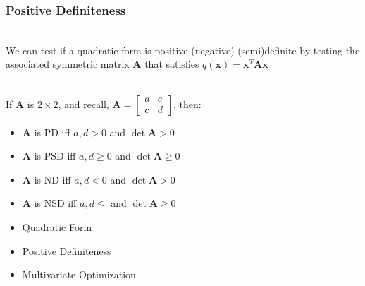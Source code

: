 \documentclass{beamer}
\numberwithin{equation}{section}
\begin{document}
\begin{frame}
\frametitle{Positive Definiteness}

\ \\We can test if a quadratic form is positive (negative) (semi)definite by testing the associated symmetric matrix $\mathbf{A}$ that satisfies $q(\mathbf{x})=\mathbf{x}^T\mathbf{A}\mathbf{x}$ \pause

\ \\If $\mathbf{A}$ is $2\times 2$, and recall, $\mathbf{A}=\begin{bmatrix}a& c\\c& d\end{bmatrix}$, then: \pause

\begin{itemize}
\item $\mathbf{A}$ is PD iff $a, d>0$ and $\det \mathbf{A}>0$ \pause
\item $\mathbf{A}$ is PSD iff  $a, d\geq0$ and $\det \mathbf{A}\geq 0$ \pause
\item $\mathbf{A}$ is ND iff $a, d<0$ and $\det \mathbf{A}>0$ \pause
\item $\mathbf{A}$ is NSD iff  $a, d\leq $ and $\det \mathbf{A}\geq 0$
\end{itemize}

\end{frame}



\begin{frame}

\begin{itemize}
\item \textcolor{mygray}{Quadratic Form}
\item \textcolor{mygray}{Positive Definiteness}
\item \textcolor{myblack}{Multivariate Optimization}
\end{itemize}

\end{frame}
\end{document}
